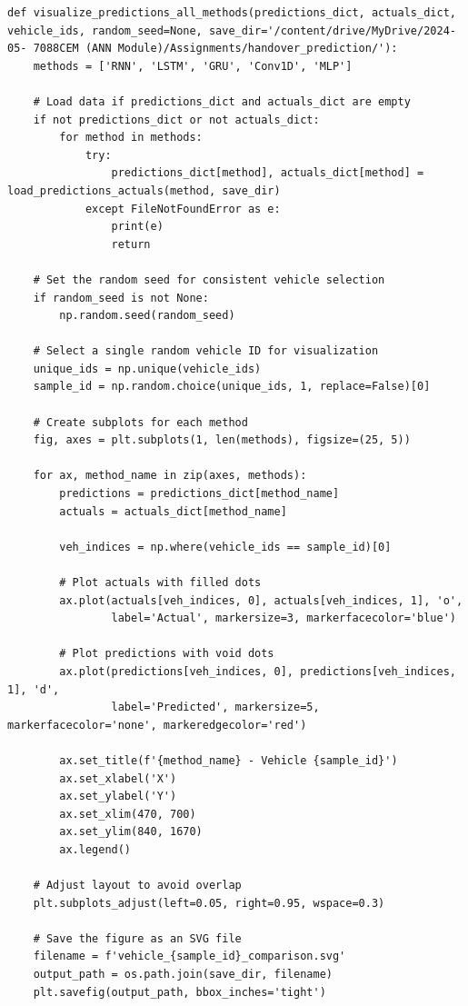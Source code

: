 \documentclass[journal,onecolumn]{IEEEtran}
\begin{document}
{\begin{appendices}
\begin{verbatim}
def visualize_predictions_all_methods(predictions_dict, actuals_dict, vehicle_ids, random_seed=None, save_dir='/content/drive/MyDrive/2024-05- 7088CEM (ANN Module)/Assignments/handover_prediction/'):
    methods = ['RNN', 'LSTM', 'GRU', 'Conv1D', 'MLP']

    # Load data if predictions_dict and actuals_dict are empty
    if not predictions_dict or not actuals_dict:
        for method in methods:
            try:
                predictions_dict[method], actuals_dict[method] = load_predictions_actuals(method, save_dir)
            except FileNotFoundError as e:
                print(e)
                return

    # Set the random seed for consistent vehicle selection
    if random_seed is not None:
        np.random.seed(random_seed)
    
    # Select a single random vehicle ID for visualization
    unique_ids = np.unique(vehicle_ids)
    sample_id = np.random.choice(unique_ids, 1, replace=False)[0]

    # Create subplots for each method
    fig, axes = plt.subplots(1, len(methods), figsize=(25, 5))
    
    for ax, method_name in zip(axes, methods):
        predictions = predictions_dict[method_name]
        actuals = actuals_dict[method_name]
        
        veh_indices = np.where(vehicle_ids == sample_id)[0]
        
        # Plot actuals with filled dots
        ax.plot(actuals[veh_indices, 0], actuals[veh_indices, 1], 'o',
                label='Actual', markersize=3, markerfacecolor='blue')

        # Plot predictions with void dots
        ax.plot(predictions[veh_indices, 0], predictions[veh_indices, 1], 'd',
                label='Predicted', markersize=5, markerfacecolor='none', markeredgecolor='red')

        ax.set_title(f'{method_name} - Vehicle {sample_id}')
        ax.set_xlabel('X')
        ax.set_ylabel('Y')
        ax.set_xlim(470, 700)
        ax.set_ylim(840, 1670)
        ax.legend()
    
    # Adjust layout to avoid overlap
    plt.subplots_adjust(left=0.05, right=0.95, wspace=0.3)

    # Save the figure as an SVG file
    filename = f'vehicle_{sample_id}_comparison.svg'
    output_path = os.path.join(save_dir, filename)
    plt.savefig(output_path, bbox_inches='tight')


\end{verbatim}
\end{appendices}}
\end{document}
